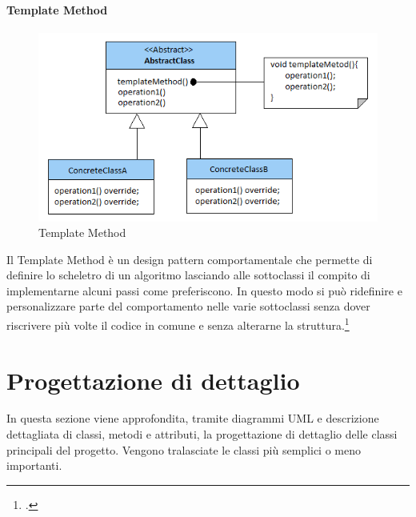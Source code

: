 \paragraph{Template Method}
\begin{figure}[!h]
    \centering
        \includegraphics[width=12cm,keepaspectratio]{../immagini/templatemethod.png}
        \caption{Template Method}
\end{figure}
Il Template Method è un design pattern comportamentale che permette di definire lo scheletro di un algoritmo lasciando alle sottoclassi il compito di implementarne alcuni passi come preferiscono. In questo modo si può ridefinire e personalizzare parte del comportamento nelle varie sottoclassi senza dover riscrivere più volte il codice in comune e senza alterarne la struttura.\footcite{gof:dp} 

\section{Progettazione di dettaglio}
In questa sezione viene approfondita, tramite diagrammi UML e descrizione dettagliata di classi, metodi e attributi, la progettazione di dettaglio delle classi principali del progetto. Vengono tralasciate le classi più semplici o meno importanti.
\newpage
